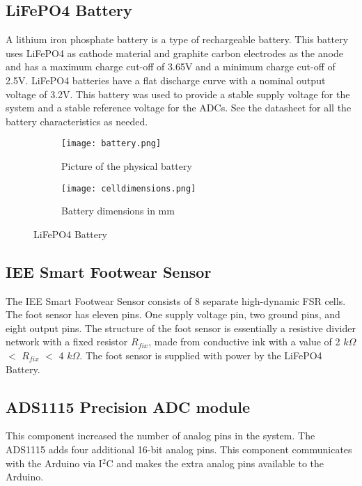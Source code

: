 \subsection{LiFePO4 Battery}
A lithium iron phosphate battery is a type of rechargeable battery. This battery uses LiFePO4 as cathode material and graphite carbon electrodes as the anode and has a maximum charge cut-off of 3.65V and a minimum charge cut-off of 2.5V. LiFePO4 batteries have a flat discharge curve with a nominal output voltage of 3.2V. This battery was used to provide a stable supply voltage for the system and a stable reference voltage for the ADCs. See the datasheet \cite{antbatt2019} for all the battery characteristics as needed.

\begin{figure}[h]

    \begin{subfigure}{0.5\textwidth}
    \texttt{[image: battery.png]} 
    \caption{Picture of the physical battery}
    \label{fig:subim1}
    \end{subfigure}
    \begin{subfigure}{0.6\textwidth}
    \texttt{[image: celldimensions.png]}
    \caption{Battery dimensions in mm}
    \label{fig:subim2}
    \end{subfigure}
    
    \caption{LiFePO4 Battery}
    \label{fig:image2}
    \end{figure}
\subsection{IEE Smart Footwear Sensor}

The IEE Smart Footwear Sensor consists of 8 separate high-dynamic FSR
cells. The foot sensor has eleven pins. One supply voltage pin, two ground pins, and eight output pins. The structure of the foot sensor is essentially a resistive divider network with a fixed resistor $R_{fix}$, made from conductive ink with a value of 2 $k\Omega$ $<$ $R_{fix}$ $<$ 4 $k\Omega$. The foot sensor is supplied with power by the LiFePO4 Battery.

\subsection{ADS1115 Precision ADC module}

This component increased the number of analog pins in the system. The ADS1115 adds four additional 16-bit analog pins. This component communicates with the Arduino via I$^2$C and makes the extra analog pins available to the Arduino.

